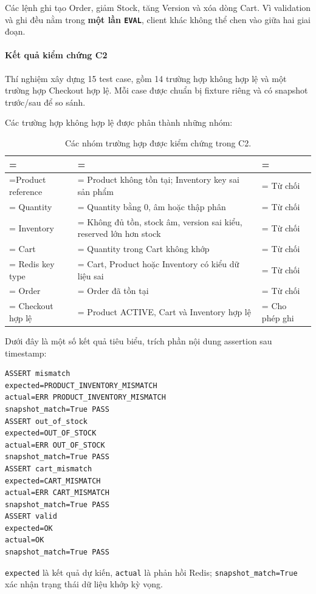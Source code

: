 Các lệnh ghi tạo Order, giảm Stock, tăng Version và xóa dòng Cart. Vì validation và ghi đều nằm trong \textbf{một lần \texttt{EVAL}}, client khác không thể chen vào giữa hai giai đoạn.

\paragraph*{Kết quả kiểm chứng C2}

Thí nghiệm xây dựng 15 test case, gồm 14 trường hợp không hợp lệ và một trường hợp Checkout hợp lệ. Mỗi case được chuẩn bị fixture riêng và có snapshot trước/sau để so sánh.

Các trường hợp không hợp lệ được phân thành những nhóm:

\begin{table}[!htbp]
\centering
\caption{Các nhóm trường hợp được kiểm chứng trong C2.}\label{tab:tx-11}
\reporttablesetup
\begin{tabularx}{\linewidth}{|>{\hsize\linewidth=\hsize}L|>{\hsize\linewidth=\hsize}L|>{\hsize\linewidth=\hsize}L|}
\hline
{}
 &  &  \\ \hline
Product reference & Product không tồn tại; Inventory key sai sản phẩm & Từ chối \\ \hline
Quantity & Quantity bằng 0, âm hoặc thập phân & Từ chối \\ \hline
Inventory & Không đủ tồn, stock âm, version sai kiểu, reserved lớn hơn stock & Từ chối \\ \hline
Cart & Quantity trong Cart không khớp & Từ chối \\ \hline
Redis key type & Cart, Product hoặc Inventory có kiểu dữ liệu sai & Từ chối \\ \hline
Order & Order đã tồn tại & Từ chối \\ \hline
Checkout hợp lệ & Product ACTIVE, Cart và Inventory hợp lệ & Cho phép ghi \\ \hline
\end{tabularx}
\end{table}
Dưới đây là một số kết quả tiêu biểu, trích phần nội dung assertion sau timestamp:

\reportblockspace{72pt}
\begingroup
{}\label{result:tx-7}
\nopagebreak[4]
\begin{Verbatim}
ASSERT mismatch
expected=PRODUCT_INVENTORY_MISMATCH
actual=ERR PRODUCT_INVENTORY_MISMATCH
snapshot_match=True PASS
ASSERT out_of_stock
expected=OUT_OF_STOCK
actual=ERR OUT_OF_STOCK
snapshot_match=True PASS
ASSERT cart_mismatch
expected=CART_MISMATCH
actual=ERR CART_MISMATCH
snapshot_match=True PASS
ASSERT valid
expected=OK
actual=OK
snapshot_match=True PASS
\end{Verbatim}
\endgroup\par\smallskip
\texttt{expected} là kết quả dự kiến, \texttt{actual} là phản hồi Redis; \texttt{snapshot\_\allowbreak{}match=\allowbreak{}True} xác nhận trạng thái dữ liệu khớp kỳ vọng.

